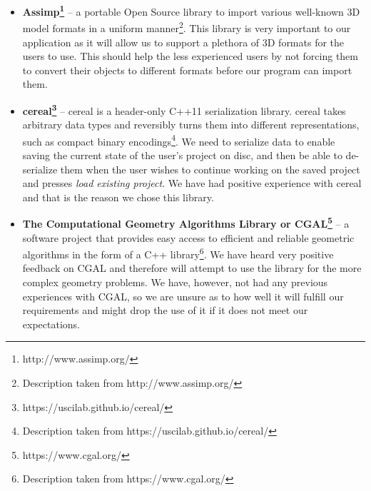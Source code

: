 \begin{itemize}
\item \textbf{Assimp\footnote{http://www.assimp.org/}} -- a portable Open Source library to import various well-known 3D model formats in a uniform manner\footnote{Description taken from http://www.assimp.org/}. This library is very important to our application as it will allow us to support a plethora of 3D formats for the users to use. This should help the less experienced users by not forcing them to convert their objects to different formats before our program can import them.

\item \textbf{cereal\footnote{https://uscilab.github.io/cereal/}} -- cereal is a header-only C++11 serialization library. cereal takes arbitrary data types and reversibly turns them into different representations, such as compact binary encodings\footnote{Description taken from https://uscilab.github.io/cereal/}. We need to serialize data to enable saving the current state of the user's project on disc, and then be able to de-serialize them when the user wishes to continue working on the saved project and presses \textit{load existing project}. We have had positive experience with cereal and that is the reason we chose this library.

\item \textbf{The Computational Geometry Algorithms Library or CGAL\footnote{https://www.cgal.org/}} -- a software project that provides easy access to efficient and reliable geometric algorithms in the form of a C++ library\footnote{Description taken from https://www.cgal.org/}. We have heard very positive feedback on CGAL and therefore will attempt to use the library for the more complex geometry problems. We have, however, not had any previous experiences with CGAL, so we are unsure as to how well it will fulfill our requirements and might drop the use of it if it does not meet our expectations.
\end{itemize}